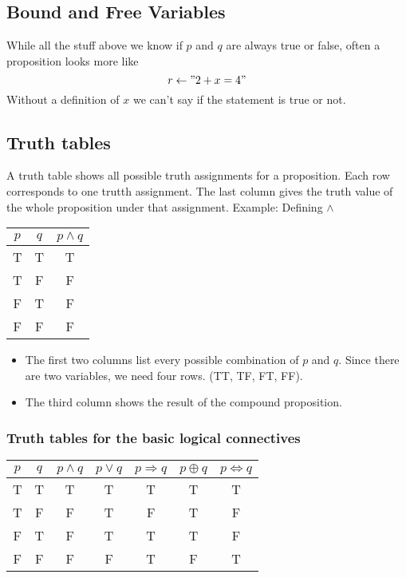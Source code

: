 \documentclass[10pt]{article}
\begin{document}
\subsection*{Bound and Free Variables}
While all the stuff above we know if $p$ and $q$ are always true or false, often a proposition looks more like
\[r \leftarrow "2 + x = 4"\]
Without a definition of $x$ we can't say if the statement is true or not.

\subsection*{Truth tables}
A truth table shows all possible truth assignments for a proposition.  Each row corresponds to one trutth assignment.  The last column gives the truth value of the whole proposition under that assignment.
Example: Defining $\land$
\begin{center}
\begin{tabular}{cc|c}
$p$ & $q$ & $p \land q$ \\ \hline
T & T & T \\
T & F & F \\
F & T & F \\
F & F & F
\end{tabular}
\end{center}
\begin{itemize}
	\item The first two columns list every possible combination of $p$ and $q$.  Since there are two variables, we need four rows.  (TT, TF, FT, FF).
	\item The third column shows the result of the compound proposition.
\end{itemize}

\subsubsection*{Truth tables for the basic logical connectives}
\begin{center}
\begin{tabular}{c|c||c|c|c|c|c}
$p$ & $q$ & $p \land q$ & $p \lor q$ & $p \Rightarrow q$ & $p \oplus q$ & $p \Leftrightarrow q$ \\ \hline
T & T & T & T & T & T & T \\
T & F & F & T & F & T & F \\
F & T & F & T & T & T & F \\
F & F & F & F & T & F & T
\end{tabular}
\end{center}
\end{document}
